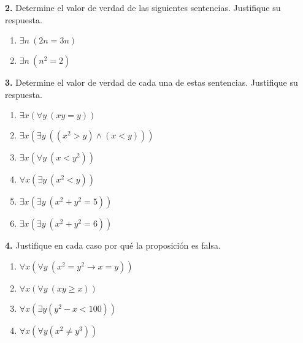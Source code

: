 \documentclass{amsart}
\begin{document}
\bigskip

\textbf{2.} Determine el valor de verdad de las siguientes sentencias. Justifique su respuesta.

\begin{enumerate}
    \item $\exists n \ (2n = 3n)$
    \item $\exists n \ (n^2 = 2)$
\end{enumerate}

\vspace{1cm}

\textbf{3.} Determine el valor de verdad de cada una de estas sentencias. Justifique su respuesta.

\begin{enumerate}
    \item $\exists x (\forall y \ (xy = y))$
    \item $\exists x (\exists y \ ((x^2 > y) \land ( x < y )))$
    \item $\exists x (\forall y \ (x < y^2))$
    \item $\forall x (\exists y \ (x^2 < y))$
    \item $\exists x (\exists y \ (x^2 + y^2 = 5))$
    \item $\exists x (\exists y \ (x^2 + y^2 = 6))$
\end{enumerate}

\vspace{1cm}

\textbf{4.} Justifique en cada caso por qué la proposición es falsa.

\begin{enumerate}
    \item $\forall x (\forall y \ (x^2 = y^2 \to x = y))$
    \item $\forall x (\forall y \ (xy \geq x))$
    \item $\forall x (\exists y (y^2 - x < 100))$
    \item $\forall x (\forall y (x^2 \neq y^3))$
\end{enumerate}

\newpage


\end{document}
